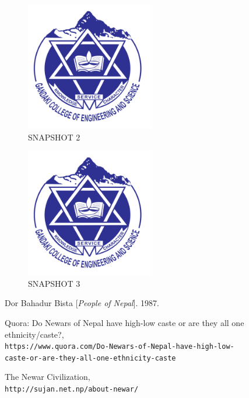 \documentclass[a4paper, 14pt]{report}
\begin{document}
\begin{description}
\begin{center}
\begin{figure}[h!]
  \includegraphics[width=0.5\textwidth]{gces.png}
  \caption{SNAPSHOT 2}
\end{figure}

\begin{figure}[h!]
  \includegraphics[width=0.5\textwidth]{gces.png}
  \caption{SNAPSHOT 3}
\end{figure}
\end{center}
	
	\end{description}
	
	\newpage
	\begin{thebibliography}{9}

		Dor Bahadur Bista
			[\textit{People of Nepal}].
		1987.

		Quora: Do Newars of Nepal have high-low caste or are they all one ethnicity/caste?,
		\\\texttt{https://www.quora.com/Do-Newars-of-Nepal-have-high-low- \\ caste-or-are-they-all-one-ethnicity-caste}

		The Newar Civilization,
		\\\texttt{http://sujan.net.np/about-newar/}

	\end{thebibliography}

	
\end{document}
